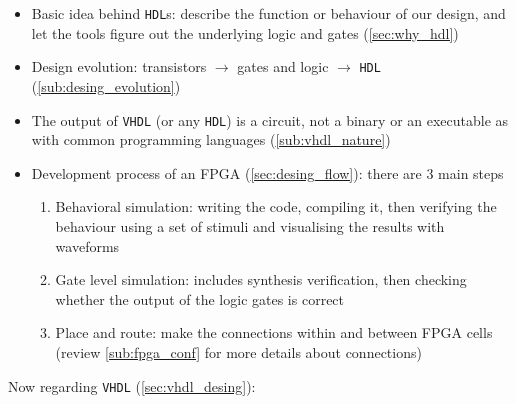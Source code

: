 \begin{itemize}

\item Basic idea behind \verb|HDL|s: describe the function or behaviour of our design, and let the tools figure out the underlying logic and gates (\ref{sec:why_hdl})

\item Design evolution: transistors $\rightarrow$ gates and logic $\rightarrow$ \verb|HDL| (\ref{sub:desing_evolution})

\item  The output of \verb|VHDL| (or any \verb|HDL|) is a circuit, not a binary or an executable as with common programming languages (\ref{sub:vhdl_nature})

\item Development process of an FPGA (\ref{sec:desing_flow}): there are 3 main steps

	\begin{enumerate}
	\item Behavioral simulation: writing the code, compiling it, then verifying the behaviour using a set of stimuli and visualising the results with waveforms
	
	\item Gate level simulation: includes synthesis verification, then checking whether the output of the logic gates is correct
	
	\item Place and route: make the connections within and between FPGA cells (review \ref{sub:fpga_conf} for more details about connections)		
		
	\end{enumerate}


\end{itemize}

Now regarding \verb|VHDL| (\ref{sec:vhdl_desing}):


